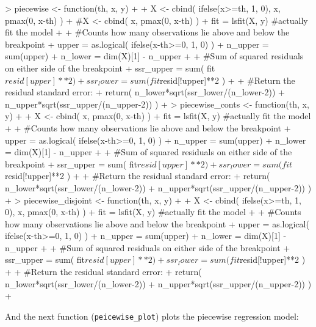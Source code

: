 \documentclass[12pt]{article}
\begin{document}
\begin{Schunk}
\begin{Sinput}
> piecewise <- function(th, x, y)
+ { 
+     X <- cbind( ifelse(x>=th, 1, 0), x, pmax(0, x-th) )
+     #X <- cbind( x, pmax(0, x-th) )
+     fit = lsfit(X, y) #actually fit the model
+     
+     #Counts how many observations lie above and below the breakpoint
+     upper = as.logical( ifelse(x-th>=0, 1, 0) )
+     n_upper = sum(upper)
+     n_lower = dim(X)[1] - n_upper
+     
+     #Sum of squared residuals on either side of the breakpoint
+     ssr_upper = sum( fit$resid[upper]**2 )
+     ssr_lower = sum( fit$resid[!upper]**2 )
+     
+     #Return the residual standard error:
+     return( n_lower*sqrt(ssr_lower/(n_lower-2)) + n_upper*sqrt(ssr_upper/(n_upper-2)) )
+ }
> piecewise_conts <- function(th, x, y)
+ { 
+     X <- cbind( x, pmax(0, x-th) )
+     fit = lsfit(X, y) #actually fit the model
+     
+     #Counts how many observations lie above and below the breakpoint
+     upper = as.logical( ifelse(x-th>=0, 1, 0) )
+     n_upper = sum(upper)
+     n_lower = dim(X)[1] - n_upper
+     
+     #Sum of squared residuals on either side of the breakpoint
+     ssr_upper = sum( fit$resid[upper]**2 )
+     ssr_lower = sum( fit$resid[!upper]**2 )
+     
+     #Return the residual standard error:
+     return( n_lower*sqrt(ssr_lower/(n_lower-2)) + n_upper*sqrt(ssr_upper/(n_upper-2)) )
+ }
> piecewise_disjoint <- function(th, x, y)
+ { 
+     X <- cbind( ifelse(x>=th, 1, 0), x, pmax(0, x-th) )
+     fit = lsfit(X, y) #actually fit the model
+     
+     #Counts how many observations lie above and below the breakpoint
+     upper = as.logical( ifelse(x-th>=0, 1, 0) )
+     n_upper = sum(upper)
+     n_lower = dim(X)[1] - n_upper
+     
+     #Sum of squared residuals on either side of the breakpoint
+     ssr_upper = sum( fit$resid[upper]**2 )
+     ssr_lower = sum( fit$resid[!upper]**2 )
+     
+     #Return the residual standard error:
+     return( n_lower*sqrt(ssr_lower/(n_lower-2)) + n_upper*sqrt(ssr_upper/(n_upper-2)) )
+ }
\end{Sinput}
\end{Schunk}

\newpage

And the next function (\verb+peicewise_plot+) plots the piecewise regression model:
\end{document}
